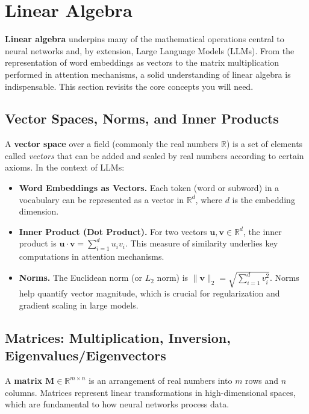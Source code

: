 \section{Linear Algebra}
\label{sec:linear_algebra}

\noindent
\textbf{Linear algebra} underpins many of the mathematical operations central to neural networks and, by extension, Large Language Models (LLMs). From the representation of word embeddings as vectors to the matrix multiplication performed in attention mechanisms, a solid understanding of linear algebra is indispensable. This section revisits the core concepts you will need.

\subsection{Vector Spaces, Norms, and Inner Products}
\noindent
A \textbf{vector space} over a field (commonly the real numbers $\mathbb{R}$) is a set of elements called \emph{vectors} that can be added and scaled by real numbers according to certain axioms. In the context of LLMs:
\begin{itemize}
    \item \textbf{Word Embeddings as Vectors.} Each token (word or subword) in a vocabulary can be represented as a vector in $\mathbb{R}^d$, where $d$ is the embedding dimension. 
    \item \textbf{Inner Product (Dot Product).} For two vectors $\mathbf{u}, \mathbf{v} \in \mathbb{R}^d$, the inner product is $\mathbf{u} \cdot \mathbf{v} = \sum_{i=1}^{d} u_i v_i$. This measure of similarity underlies key computations in attention mechanisms.
    \item \textbf{Norms.} The Euclidean norm (or $L_2$ norm) is $\|\mathbf{v}\|_2 = \sqrt{\sum_{i=1}^{d} v_i^2}$. Norms help quantify vector magnitude, which is crucial for regularization and gradient scaling in large models.
\end{itemize}

\subsection{Matrices: Multiplication, Inversion, Eigenvalues/Eigenvectors}
\noindent
A \textbf{matrix} $\mathbf{M} \in \mathbb{R}^{m \times n}$ is an arrangement of real numbers into $m$ rows and $n$ columns. Matrices represent linear transformations in high-dimensional spaces, which are fundamental to how neural networks process data.

